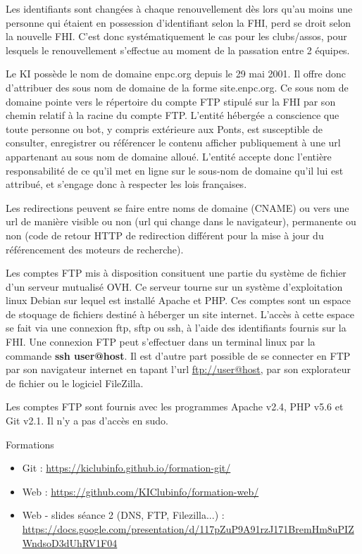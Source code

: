 \documentclass{ki019}
\begin{document}

Les identifiants sont changées à chaque renouvellement dès lors qu'au moins une personne qui étaient en possession d'identifiant selon la FHI, perd se droit selon la nouvelle FHI. C'est donc systématiquement le cas pour les clubs/assos, pour lesquels le renouvellement s'effectue au moment de la passation entre 2 équipes.


Le KI possède le nom de domaine enpc.org depuis le 29 mai 2001. Il offre donc d'attribuer des sous nom de domaine de la forme site.enpc.org. Ce sous nom de domaine pointe vers le répertoire du compte FTP stipulé sur la FHI par son chemin relatif à la racine du compte FTP.
L'entité hébergée a conscience que toute personne ou bot, y compris extérieure aux Ponts, est susceptible de consulter, enregistrer ou référencer le contenu afficher publiquement à une url appartenant au sous nom de domaine alloué. L'entité accepte donc l'entière responsabilité de ce qu'il met en ligne sur le sous-nom de domaine qu'il lui est attribué, et s'engage donc à respecter les lois françaises.

Les redirections peuvent se faire entre noms de domaine (CNAME) ou vers une url de manière visible ou non (url qui change dans le navigateur), permanente ou non (code de retour HTTP de redirection différent pour la mise à jour du référencement des moteurs de recherche).


Les comptes FTP mis à disposition consituent une partie du système de fichier d'un serveur mutualisé OVH. Ce serveur tourne sur un système d'exploitation linux Debian sur lequel est installé Apache et PHP. Ces comptes sont un espace de stoquage de fichiers destiné à héberger un site internet. L'accès à cette espace se fait via une connexion ftp, sftp ou ssh, à l'aide des identifiants fournis sur la FHI. Une connexion FTP peut s'effectuer dans un terminal linux par la commande \textbf{ssh user@host}. Il est d'autre part possible de se connecter en FTP par son navigateur internet en tapant l'url \url{ftp://user@host}, par son explorateur de fichier ou le logiciel FileZilla.

Les comptes FTP sont fournis avec les programmes Apache v2.4, PHP v5.6 et Git v2.1. Il n'y a pas d'accès en sudo.

Formations
\begin{itemize}
\item Git : \url{https://kiclubinfo.github.io/formation-git/}
\item Web : \url{https://github.com/KIClubinfo/formation-web/}
\item Web - slides séance 2 (DNS, FTP, Filezilla...) : \\
\url{https://docs.google.com/presentation/d/117pZuP9A91rzJ171BremHm8uPIZWndsoD3dUhRV1F04}
\end{itemize}
\end{document}
